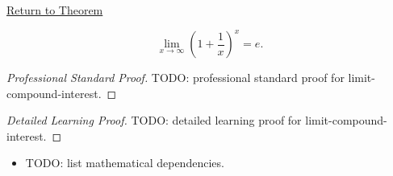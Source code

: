 \newpage
{}
\label{prf:limit-compound-interest}

\begin{remark*}[Return]
\hyperref[prop:limit-compound-interest]{Return to Theorem}
\end{remark*}

\begin{proposition*}
\[
  \lim_{x \to \infty} \left(1 + \frac{1}{x}\right)^x = e.
\]

\smallskip\noindent
\end{proposition*}

\begin{proof}[Professional Standard Proof]
\LRAProofBodyStart
TODO: professional standard proof for limit-compound-interest.
\end{proof}

\begin{proof}[Detailed Learning Proof]
\LRAProofBodyStart
TODO: detailed learning proof for limit-compound-interest.
\end{proof}

\begin{remark*}
\end{remark*}

\begin{dependencies}
\begin{itemize}
  \item TODO: list mathematical dependencies.
\end{itemize}
\end{dependencies}

\clearpage

